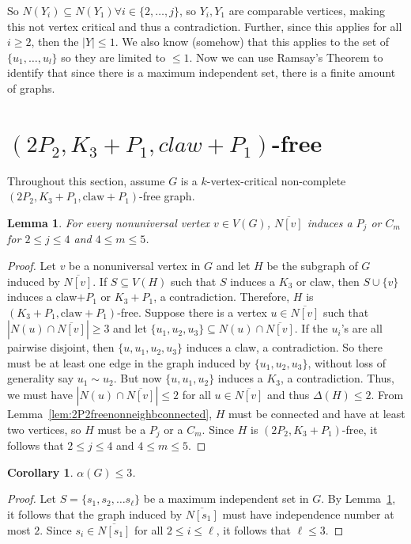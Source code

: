 \documentclass[11pt]{article}
\newtheorem{lemma}[theorem]{Lemma}
\newtheorem{corollary}[theorem]{Corollary}
\theoremstyle{definition}
\newcommand{\noneighbs}{\overline{N[v]}}
\begin{document}
So $N(Y_i) \subseteq N(Y_1) \forall i \in \{2, \dots, j\}$, so $Y_i, Y_1$ are comparable vertices, making this not vertex critical and thus a contradiction. Further, since this applies for all $i \geq 2$, then the $|Y| \leq 1$. We also know (somehow) that this applies to the set of $\{u_1, \dots, u_l \}$ so they are limited to $\leq 1$.
Now we can use Ramsay's Theorem to identify that since there is a maximum independent set, there is a finite amount of graphs.

\section{$(2P_2, K_3 + P_1, claw + P_1)$-free}

Throughout this section, assume $G$ is a $k$-vertex-critical non-complete $(2P_2, K_3 + P_1, \text{claw} + P_1)$-free graph. 



\begin{lemma}\label{lem:pathorcyclenonneighbourhood}
For every nonuniversal vertex $v\in V(G)$, $\noneighbs$ induces a $P_j$ or $C_m$ for $2\le j\le 4$ and $4\le m\le 5$.
\end{lemma}
\begin{proof}
Let $v$ be a nonuniversal vertex in $G$ and let $H$ be the subgraph of $G$ induced by $\noneighbs$. If $S\subseteq V(H)$ such that $S$ induces a $K_3$ or claw, then $S\cup\{v\}$ induces a claw$+P_1$ or $K_3+P_1$, a contradiction. Therefore, $H$ is $(K_3+P_1,\text{claw}+P_1)$-free. Suppose there is a vertex $u\in \noneighbs$ such that $|N(u)\cap \noneighbs|\ge 3$ and let $\{u_1,u_2,u_3\}\subseteq N(u)\cap \noneighbs$. If the $u_i$'s are all pairwise disjoint, then $\{u,u_1,u_2,u_3\}$ induces a claw, a contradiction. So there must be at least one edge in the graph induced by $\{u_1,u_2,u_3\}$, without loss of generality say $u_1\sim u_2$. But now $\{u,u_1,u_2\}$ induces a $K_3$, a contradiction. Thus, we must have $|N(u)\cap \noneighbs|\le 2$ for all $u\in \noneighbs$ and thus $\Delta(H)\le 2$. From Lemma~\ref{lem:2P2freenonneighbconnected}, $H$ must be connected and have at least two vertices, so $H$ must be a $P_j$ or a $C_m$. Since $H$ is $(2P_2,K_3+P_1)$-free, it follows that $2\le j\le 4$ and $4\le m\le 5$. 
\end{proof}


\begin{corollary}\label{cor:indnumatmost3}
$\alpha(G)\le 3$.
\end{corollary}
\begin{proof}
Let $S=\{s_1,s_2,\dots s_{\ell}\}$ be a maximum independent set in $G$. By Lemma~\ref{lem:pathorcyclenonneighbourhood}, it follows that the graph induced by $\overline{N[s_1]}$ must have independence number at most $2$. Since $s_i\in \overline{N[s_1]}$ for all $2\le i\le \ell$, it follows that $\ell\le 3$.
\end{proof}
\end{document}
